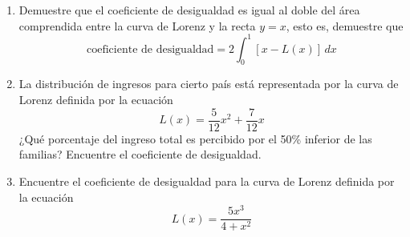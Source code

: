     \begin{enumerate}
        \item[(a)] Demuestre que el coeficiente de desigualdad es igual al doble del área comprendida entre la curva de Lorenz y la recta $y = x$, esto es, demuestre que
        \[ \text{coeficiente de desigualdad} = 2 \int_{0}^{1} [x - L(x)] \, dx \]
        \item[(b)] La distribución de ingresos para cierto país está representada por la curva de Lorenz definida por la ecuación
        \[ L(x) = \frac{5}{12}x^2 + \frac{7}{12}x \]
        ¿Qué porcentaje del ingreso total es percibido por el 50\% inferior de las familias? Encuentre el coeficiente de desigualdad.
        \item[(c)] Encuentre el coeficiente de desigualdad para la curva de Lorenz definida por la ecuación
        \[ L(x) = \frac{5x^3}{4 + x^2} \]
    \end{enumerate}
